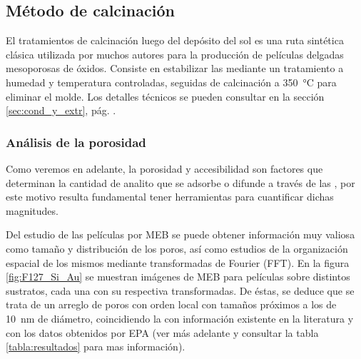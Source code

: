 	 \pagebreak\subsection{Método de calcinación}
	 	
	 		El tratamientos de calcinación luego del depósito del sol es una ruta sintética clásica utilizada por muchos autores para la producción de películas delgadas mesoporosas de óxidos\cite{Soler-Illia2002a,Brinker1999,Soler-Illia2006,Grosso2004,Innocenzi2013,angelome2011}. Consiste en estabilizar las \pdm\space mediante un tratamiento a humedad y temperatura controladas, seguidas de calcinación a \SI{350}{\celsius} para eliminar el molde. Los detalles técnicos se pueden consultar en la sección \ref{sec:cond_y_extr}, pág. \pageref{sec:cond_y_extr}.

	 	  \subsubsection{Análisis de la porosidad}

		 Como veremos en adelante, la porosidad y accesibilidad son factores que determinan la cantidad de analito que se adsorbe o difunde a través de las \pdm, por este motivo resulta fundamental tener herramientas para cuantificar dichas magnitudes. 

		 Del estudio de las películas por MEB se puede obtener información muy valiosa como tamaño y distribución de los poros, así como estudios de la organización espacial de los mismos mediante transformadas de Fourier (FFT). En la figura \ref{fig:F127_Si_Au} se muestran imágenes de MEB para películas \pdmF sobre distintos sustratos, cada una con su respectiva transformadas. De éstas, se deduce que se trata de un arreglo de poros con orden local con tamaños próximos a los de \SI{10}{\nm} de diámetro, coincidiendo la con información existente en la literatura\cite{urade2005,angelome2011,lee2006} y con los datos obtenidos por EPA (ver más adelante y consultar la tabla \ref{tabla:resultados} para mas información).  

